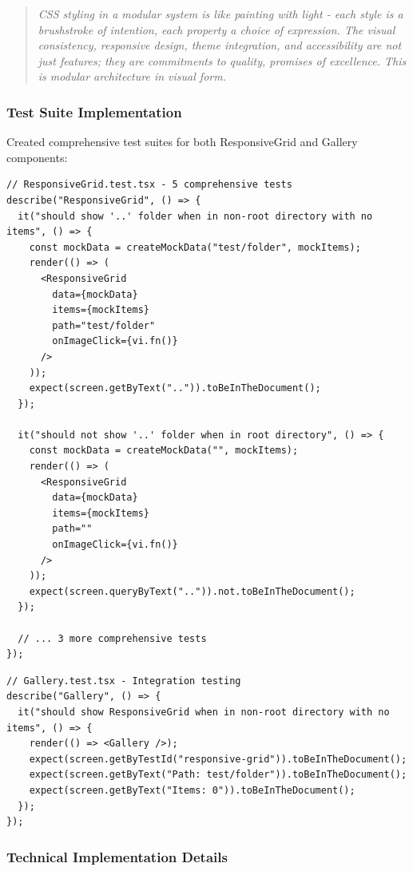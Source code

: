 \documentclass[11pt]{article}
\begin{document}
\begin{quote}
\emph{CSS styling in a modular system is like painting with light - each style is a brushstroke of intention, each property a choice of expression. The visual consistency, responsive design, theme integration, and accessibility are not just features; they are commitments to quality, promises of excellence. This is modular architecture in visual form.}
\end{quote}

\subsubsection{Test Suite Implementation}

Created comprehensive test suites for both ResponsiveGrid and Gallery components:

\begin{lstlisting}[style=typescript]
// ResponsiveGrid.test.tsx - 5 comprehensive tests
describe("ResponsiveGrid", () => {
  it("should show '..' folder when in non-root directory with no items", () => {
    const mockData = createMockData("test/folder", mockItems);
    render(() => (
      <ResponsiveGrid
        data={mockData}
        items={mockItems}
        path="test/folder"
        onImageClick={vi.fn()}
      />
    ));
    expect(screen.getByText("..")).toBeInTheDocument();
  });

  it("should not show '..' folder when in root directory", () => {
    const mockData = createMockData("", mockItems);
    render(() => (
      <ResponsiveGrid
        data={mockData}
        items={mockItems}
        path=""
        onImageClick={vi.fn()}
      />
    ));
    expect(screen.queryByText("..")).not.toBeInTheDocument();
  });

  // ... 3 more comprehensive tests
});
\end{lstlisting}

\begin{lstlisting}[style=typescript]
// Gallery.test.tsx - Integration testing
describe("Gallery", () => {
  it("should show ResponsiveGrid when in non-root directory with no items", () => {
    render(() => <Gallery />);
    expect(screen.getByTestId("responsive-grid")).toBeInTheDocument();
    expect(screen.getByText("Path: test/folder")).toBeInTheDocument();
    expect(screen.getByText("Items: 0")).toBeInTheDocument();
  });
});
\end{lstlisting}

\subsubsection{Technical Implementation Details}
\end{document}
